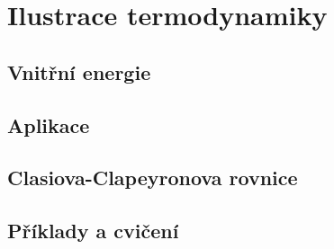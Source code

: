 \chapter{Ilustrace termodynamiky}\label{fyz:IchapXLV}
\minitoc
  \section{Vnitřní energie}\label{fyz:IchapXLVsecI}
  \section{Aplikace}\label{fyz:IchapXLVsecII}
  \section{Clasiova-Clapeyronova rovnice}\label{fyz:IchapXLVsecIII}
  \section{Příklady a cvičení}\label{fyz:IchapXLVsecIV}